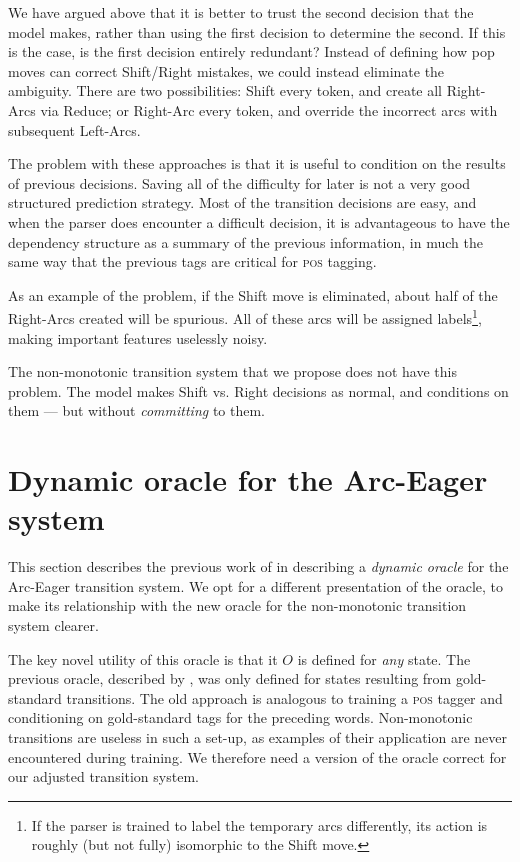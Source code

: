 \documentclass[11pt,letterpaper]{article}
\newcommand{\pos}{\textsc{pos}\xspace}
\begin{document}
We have argued above that it is better to trust the second decision that the model
makes, rather than using the first decision to determine the second. If this is
the case, is the first decision entirely redundant?
Instead of defining how pop moves can correct Shift/Right mistakes, we could
instead eliminate the ambiguity. There are two possibilities:
Shift every token, and create all Right-Arcs via Reduce; or Right-Arc every token,
and override the incorrect arcs with subsequent Left-Arcs.

The problem with these approaches is that it is useful to condition
on the results of previous decisions. Saving all of the difficulty for later
is not a very good structured prediction strategy. Most of the transition decisions are
easy, and when the parser does encounter a difficult decision, it is advantageous
to have the dependency structure as a summary of the previous information, in
much the same way that the previous tags are critical for \pos tagging. 

As an example of the problem, if the Shift move is
eliminated, about half of the Right-Arcs created will be spurious. All of these
arcs will be assigned labels\footnote{If the parser is trained to label the temporary
arcs differently, its action is roughly (but not fully) isomorphic to the Shift move.},
making important features uselessly noisy.

The non-monotonic transition system that we propose does not have this problem.
The model makes Shift vs. Right decisions as normal, and conditions on them --- but
without \emph{committing} to them.



\section{Dynamic oracle for the Arc-Eager system}
\label{ref:oracle}

This section describes the previous work of \citet{goldberg:12} in describing
a \emph{dynamic oracle} for the Arc-Eager transition system.
We opt for a different presentation of the oracle,
to make its relationship with the new oracle for the non-monotonic transition
system clearer.

The key novel utility of this oracle is that it
$O$ is defined for \emph{any} state. The previous oracle, described by 
\citet{nivre:04}, was only defined for states resulting from gold-standard
transitions. The old approach is analogous to training a \pos tagger
and conditioning on gold-standard tags for the preceding words.
Non-monotonic transitions are useless in such a set-up, as examples of their
application are never encountered during training. We therefore need a version
of the oracle correct for our adjusted transition system.
\end{document}
